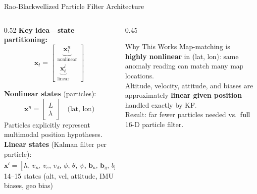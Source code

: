 \documentclass[aspectratio=169]{beamer}
\begin{document}
\begin{frame}{Rao-Blackwellized Particle Filter Architecture}
    \begin{columns}
        \begin{column}{0.52\textwidth}
            \textbf{Key idea---state partitioning:}
            \[
            \mathbf{x}_t = \begin{bmatrix} \underbrace{\mathbf{x}^n_t}_{\text{nonlinear}} \\ \underbrace{\mathbf{x}^l_t}_{\text{linear}} \end{bmatrix}
            \]

            \medskip
            \textbf{Nonlinear states} (particles):
            \[
            \mathbf{x}^n = \begin{bmatrix} L \\ \lambda \end{bmatrix} \quad \text{(lat, lon)}
            \]
            Particles explicitly represent multimodal position hypotheses.
            \textbf{Linear states} (Kalman filter per particle):
            \[
            \mathbf{x}^l = [h,\, v_n,\, v_e,\, v_d,\, \phi,\, \theta,\, \psi,\, \mathbf{b}_a,\, \mathbf{b}_g,\, b_\text{geo}]^\top
            \]
            14--15 states (alt, vel, attitude, IMU biases, geo bias)
        \end{column}
        \begin{column}{0.45\textwidth}
            \begin{exampleblock}{Why This Works}
                \small
                Map-matching is \textbf{highly nonlinear} in (lat, lon): same anomaly reading can match many map locations.\\[0.4em]
                Altitude, velocity, attitude, and biases are approximately \textbf{linear given position}---handled exactly by KF.\\[0.4em]
                Result: far fewer particles needed vs.\ full 16-D particle filter.
            \end{exampleblock}
        \end{column}
    \end{columns}
\end{frame}
\end{document}

